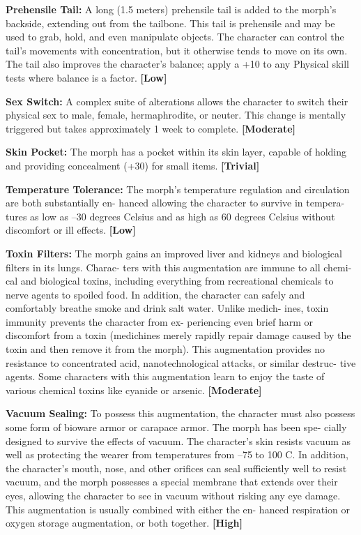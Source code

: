 \textbf{Prehensile Tail:} A long (1.5 meters) prehensile 
tail is added to the morph's backside, extending out 
from the tailbone. This tail is prehensile and may 
be used to grab, hold, and even manipulate objects. 
The character can control the tail's movements with 
concentration, but it otherwise tends to move on its 
own. The tail also improves the character's balance; 
apply a +10 to any Physical skill tests where balance 
is a factor. \textbf{[Low]}

\textbf{Sex Switch:} A complex suite of alterations allows 
the character to switch their physical sex to male, 
female, hermaphrodite, or neuter. This change is 
mentally triggered but takes approximately 1 week to 
complete. \textbf{[Moderate]}

\textbf{Skin Pocket: }The morph has a pocket within its skin 
layer, capable of holding and providing concealment 
(+30) for small items. \textbf{[Trivial]}

\textbf{Temperature Tolerance: }The morph's temperature 
regulation and circulation are both substantially en-
hanced allowing the character to survive in tempera-
tures as low as –30 degrees Celsius and as high as 60 
degrees Celsius without discomfort or ill effects. \textbf{[Low]}

\textbf{Toxin Filters: }The morph gains an improved liver 
and kidneys and biological filters in its lungs. Charac-
ters with this augmentation are immune to all chemi-
cal and biological toxins, including everything from 
recreational chemicals to nerve agents to spoiled food. 
In addition, the character can safely and comfortably 
breathe smoke and drink salt water. Unlike medich-
ines, toxin immunity prevents the character from ex-
periencing even brief harm or discomfort from a toxin 
(medichines merely rapidly repair damage caused by 
the toxin and then remove it from the morph). This 
augmentation provides no resistance to concentrated 
acid, nanotechnological attacks, or similar destruc-
tive agents. Some characters with this augmentation 
learn to enjoy the taste of various chemical toxins like 
cyanide or arsenic. \textbf{[Moderate]}

\textbf{Vacuum Sealing:} To possess this augmentation, the 
character must also possess some form of bioware 
armor or carapace armor. The morph has been spe-
cially designed to survive the effects of vacuum. The 
character's skin resists vacuum as well as protecting 
the wearer from temperatures from –75 to 100 C. 
In addition, the character's mouth, nose, and other 
orifices can seal sufficiently well to resist vacuum, 
and the morph possesses a special membrane that 
extends over their eyes, allowing the character to 
see in vacuum without risking any eye damage. This 
augmentation is usually combined with either the en-
hanced respiration or oxygen storage augmentation, 
or both together. \textbf{[High]}

